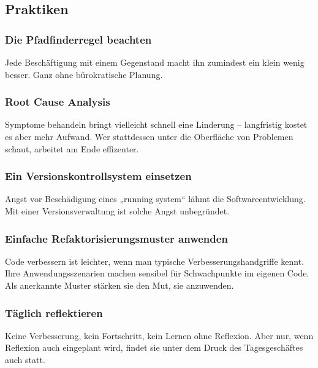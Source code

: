 \documentclass[a5paper, landscape]{article}
\begin{document}
	\begin{minipage}[t]{.5\textwidth}
		\subsection*{Praktiken}
		\subsubsection*{Die Pfadfinderregel beachten}
		Jede Beschäftigung mit einem Gegenstand macht ihn zumindest ein klein wenig besser. Ganz ohne bürokratische Planung. %
		\subsubsection*{Root Cause Analysis}
		Symptome behandeln bringt vielleicht schnell eine Linderung – langfristig kostet es aber mehr Aufwand. Wer stattdessen unter die Oberfläche von Problemen schaut, arbeitet am Ende effizenter.
		\subsubsection*{Ein Versionskontrollsystem einsetzen}
		Angst vor Beschädigung eines „running system“ lähmt die Softwareentwicklung. Mit einer Versionsverwaltung ist solche Angst unbegründet.
		\subsubsection*{Einfache Refaktorisierungsmuster anwenden}
		Code verbessern ist leichter, wenn man typische Verbesserungshandgriffe kennt. Ihre Anwendungsszenarien machen sensibel für Schwachpunkte im eigenen Code. Als anerkannte Muster stärken sie den Mut, sie anzuwenden.
		\subsubsection*{Täglich reflektieren}
		Keine Verbesserung, kein Fortschritt, kein Lernen ohne Reflexion. Aber nur, wenn Reflexion auch eingeplant wird, findet sie unter dem Druck des Tagesgeschäftes auch statt.
	\end{minipage}
\end{document}
